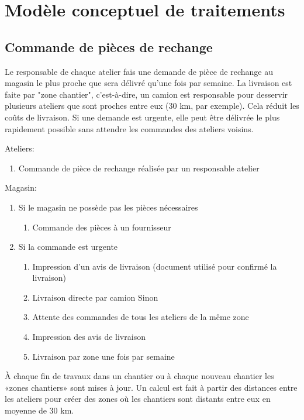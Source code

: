 \section{Modèle conceptuel de traitements}

\subsection{Commande de pièces de rechange}


Le responsable de chaque atelier fais une demande de pièce de rechange au
magasin le plus proche que sera délivré qu'une fois par semaine.  La
livraison est faite par "zone chantier", c'est-à-dire, un camion est
responsable pour desservir plusieurs ateliers que sont proches entre eux
(30 km, par exemple). Cela réduit les coûts de livraison.
Si une demande est urgente, elle peut être délivrée le plus rapidement
possible sans attendre les commandes des ateliers voisins.

Ateliers:
\begin{enumerate}
    \item Commande de pièce de rechange réalisée par un responsable atelier
\end{enumerate}

Magasin:
\begin{enumerate}
    \item Si le magasin ne possède pas les pièces nécessaires
    \begin{enumerate}
        \item Commande des pièces à un fournisseur
    \end{enumerate}

    \item Si la commande est urgente
    \begin{enumerate}
        \item Impression d'un avis de livraison
        (document utilisé pour confirmé la livraison)
        \item Livraison directe par camion
        Sinon
        \item Attente des commandes de tous les ateliers de la même zone
        \item Impression des avis de livraison
        \item Livraison par zone une fois par semaine
    \end{enumerate}
\end{enumerate}

À chaque fin de travaux dans un chantier ou à chaque nouveau chantier les
«zones chantiers» sont mises à jour. Un calcul est fait à partir des
distances entre les ateliers pour créer des zones où les chantiers sont
distants entre eux en moyenne de 30 km.


